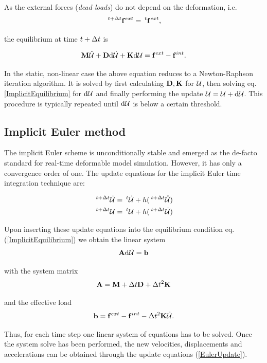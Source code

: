 As the external forces (\emph{dead loads}) do not depend on the deformation, i.e.  
\begin{equation}
\mtvh \mfext = \mth \mfext,
\end{equation}

the equilibrium at time $t+\Delta t $ is

\begin{equation}
\mathbf M\ddot{\mathcal{U} } + \mathbf D \textnormal{d}\dot{\mathcal{U}}  + \mathbf K {\textnormal{d}{\mathcal{U}} } = \mathbf f ^{ext} - \mathbf f ^{int}.
\label{ImplicitEquilibrium}
\end{equation}

In the static, non-linear case the above equation reduces to a Newton-Raphson iteration algorithm. It is solved by first calculating $\mathbf D, \mathbf K$ for $\mathcal{U} $, then solving eq. \ref{ImplicitEquilibrium} for $\textnormal{d}{\mathcal{U}} $ and finally performing the update $\mathcal{U}  = \mathcal{U}  + \textnormal{d}{\mathcal{U}} $. This procedure is typically repeated until $\textnormal{d}{\mathcal{U}} $ is below a certain threshold. 

\subsection{Implicit Euler method}
The implicit Euler scheme is unconditionally stable and emerged as the de-facto standard for real-time deformable model simulation. However, it has only a convergence order of one. The update equations for the implicit Euler time integration technique are:

\begin{alignat}{1}
\mtvh \mcv &= \mth \mcv + h (\mtvh \mca) \notag \\
\mtvh \mcu &= \mth \mcu + h (\mtvh \mcv)
\label{EulerUpdate}
\end{alignat}

Upon inserting these update equations into the equilibrium condition eq. (\ref{ImplicitEquilibrium}) we obtain the linear system
\begin{equation}
\mathbf{ A } \textnormal{d}\dot{\mathcal{U}}  = \mathbf{ b }
\label{LinearSystemEuler}
\end{equation}

with the system matrix 
\begin{equation}
\mathbf{A } = \mathbf M + \Delta t  \mathbf D + \Delta t ^2 \mathbf K
\end{equation}

and the effective load
\begin{equation}
\mathbf{ b} = \mathbf f ^{ext} - \mathbf f ^{int} - \Delta t ^2 \mathbf K {\mathcal{\dot{U}}}.
\end{equation}

Thus, for each time step one linear system of equations has to be solved. Once the system solve has been performed, the new velocities, displacements and accelerations can be obtained through the update equations (\ref{EulerUpdate}).

